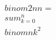 \documentclass[preview]{standalone}
\begin{document}
\begin{align*}
\quad\\binom{2n}{n} = \quad\\sum_{k=0}^n \quad\\binom{n}{k}^2
\end{align*}
\end{document}
